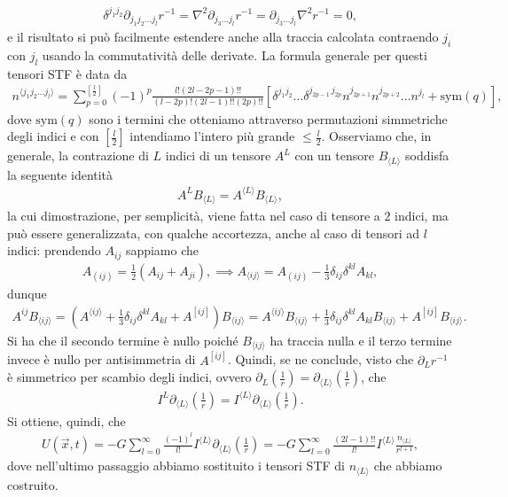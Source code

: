 \begin{align}
	\delta^{j_1 j_2} \partial_{j_1 j_2 \ldots j_l} r^{-1} = \nabla^2 \partial_{j_3 \ldots j_l} r^{-1} = \partial_{j_3 \ldots j_l} \nabla^2 r^{-1} = 0, 
\end{align}
e il risultato si può facilmente estendere anche alla traccia calcolata contraendo $j_i$ con $j_l$ usando la commutatività delle derivate. La formula generale per questi tensori STF è data da
\begin{align}
	n^{\langle j_1 j_2 \ldots j_l \rangle} = \sum_{p=0}^{\left[ \frac{l}{2} \right]} (-1)^p \frac{l!(2l-2p-1)!!}{(l-2p)!(2l-1)!!(2p)!!}\left[ \delta^{j_1 j_2} \ldots \delta^{j_{2p-1} \, j_{2p}} n^{j_{2p+1}} n^{j_{2p+2}} \ldots n^{j_l} + \text{sym}(q) \right],
\end{align}
dove $\text{sym}(q)$ sono i termini che otteniamo attraverso permutazioni simmetriche degli indici e con $\left[ \frac{l}{2} \right]$ intendiamo l'intero più grande $\leq \frac{l}{2}$. Osserviamo che, in generale, la contrazione di $L$ indici di un tensore $A^{L}$ con un tensore $B_{\langle L \rangle}$ soddisfa la seguente identità
\begin{align}
	A^{L} B_{\langle L \rangle} = A^{\langle L \rangle} B_{\langle L \rangle},
\end{align}
la cui dimostrazione, per semplicità, viene fatta nel caso di tensore a $2$ indici, ma può essere generalizzata, con qualche accortezza, anche al caso di tensori ad $l$ indici: prendendo $A_{ij}$ sappiamo che
\begin{align}
	A_{(ij)} = \frac{1}{2}(A_{ij} + A_{ji}), \implies A_{\langle ij \rangle} = A_{(ij)} - \frac13 \delta_{ij} \delta^{kl} A_{kl},
\end{align}
dunque
\begin{align}
	A^{ij} B_{\langle ij \rangle} = (A^{\langle ij \rangle} + \frac13 \delta_{ij} \delta^{kl} A_{kl} + A^{[ij]}) B_{\langle ij \rangle} = A^{\langle ij \rangle} B_{\langle ij \rangle} + \frac{1}{3} \delta_{ij} \delta^{kl} A_{kl} B_{\langle ij \rangle} + A^{[ij]} B_{\langle ij \rangle}.
\end{align}
Si ha che il secondo termine è nullo poiché $B_{\langle ij \rangle}$ ha traccia nulla e il terzo termine invece è nullo per antisimmetria di $A^{[ij]}$. Quindi, se ne conclude, visto che $\partial_L r^{-1}$ è simmetrico per scambio degli indici, ovvero $\partial_L \left( \frac{1}{r} \right) = \partial_{\langle L \rangle} \left(\frac{1}{r} \right)$, che
\begin{align}
	I^{L} \partial_{\langle L \rangle} \left( \frac{1}{r} \right) = I^{\langle L \rangle} \partial_{\langle L \rangle} \left( \frac{1}{r} \right).
\end{align}
Si ottiene, quindi, che
\begin{align}
	U(\vec{x}, t) = -G \sum_{l=0}^{\infty} \frac{(-1)^{l}}{l!} I^{\langle L \rangle} \partial_{\langle L \rangle} \left( \frac{1}{r} \right) = -G \sum_{l=0}^{\infty} \frac{(2l-1)!!}{l!} I^{\langle L \rangle} \frac{n_{\langle L \rangle}}{r^{l+1}},
\end{align}
dove nell'ultimo passaggio abbiamo sostituito i tensori STF di $n_{\langle L \rangle}$ che abbiamo costruito.

